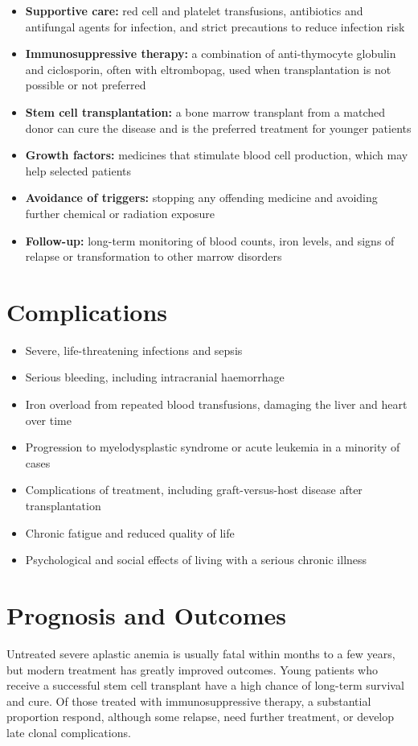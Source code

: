 \begin{itemize}
    \item \textbf{Supportive care:} red cell and platelet transfusions, antibiotics and antifungal agents for infection, and strict precautions to reduce infection risk
    \item \textbf{Immunosuppressive therapy:} a combination of anti-thymocyte globulin and ciclosporin, often with eltrombopag, used when transplantation is not possible or not preferred
    \item \textbf{Stem cell transplantation:} a bone marrow transplant from a matched donor can cure the disease and is the preferred treatment for younger patients
    \item \textbf{Growth factors:} medicines that stimulate blood cell production, which may help selected patients
    \item \textbf{Avoidance of triggers:} stopping any offending medicine and avoiding further chemical or radiation exposure
    \item \textbf{Follow-up:} long-term monitoring of blood counts, iron levels, and signs of relapse or transformation to other marrow disorders
\end{itemize}

\section*{Complications}
\begin{itemize}
    \item Severe, life-threatening infections and sepsis
    \item Serious bleeding, including intracranial haemorrhage
    \item Iron overload from repeated blood transfusions, damaging the liver and heart over time
    \item Progression to myelodysplastic syndrome or acute leukemia in a minority of cases
    \item Complications of treatment, including graft-versus-host disease after transplantation
    \item Chronic fatigue and reduced quality of life
    \item Psychological and social effects of living with a serious chronic illness
\end{itemize}

\section*{Prognosis and Outcomes}
Untreated severe aplastic anemia is usually fatal within months to a few years, but modern treatment has greatly improved outcomes. Young patients who receive a successful stem cell transplant have a high chance of long-term survival and cure. Of those treated with immunosuppressive therapy, a substantial proportion respond, although some relapse, need further treatment, or develop late clonal complications.


